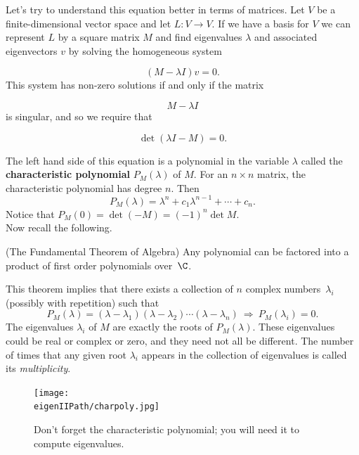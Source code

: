 Let's try to understand this equation better in terms of matrices.
Let $V$ be a finite-dimensional vector space and let $L \colon V\rightarrow V$.  
If we have a basis for $V$ we can represent $L$ by a square matrix $M$ and find eigenvalues $\lambda$ and associated eigenvectors $v$ by solving the homogeneous system

\[
(M-\lambda I)v=0.
\]
This system has non-zero solutions if and only if the matrix

\[
M-\lambda I
\]
is singular, and so we require that

\[
\det (\lambda I-M) = 0.
\]

The left hand side of this equation is a polynomial in the variable $\lambda$ called the {\bf characteristic polynomial} $P_M(\lambda)$ of $M$.  For an $n\times n$ matrix, the characteristic polynomial has degree $n$.  Then 
\[
P_M(\lambda) = \lambda^n+c_1\lambda^{n-1}+\cdots+c_n.
\]
Notice that $P_M(0)=\det (-M)=(-1)^n\det M$.\\

Now recall the following.
\begin{theorem} (The {Fundamental Theorem of Algebra}) 
Any polynomial can be factored into a product of first order polynomials over~$\C$.  
\end{theorem}
This theorem implies that there exists a collection of $n$ complex numbers~$\lambda_i$ (possibly with repetition) such that
\[
P_M(\lambda)=(\lambda-\lambda_1)(\lambda-\lambda_2)\cdots(\lambda-\lambda_n)\: \Longrightarrow\: P_M(\lambda_i)=0.
\]
The eigenvalues $\lambda_i$ of $M$ are exactly the roots of $P_M(\lambda)$.  These eigenvalues could be real or complex or zero, and they need not all be different.  The number of times that any given root $\lambda_i$ appears in the collection of eigenvalues is called its \emph{multiplicity}.

\begin{figure}
\begin{center}
\texttt{[image: \\eigenIIPath/charpoly.jpg]}
\end{center}
\caption{Don't forget the characteristic polynomial; you will need it to compute eigenvalues.}
\end{figure}


